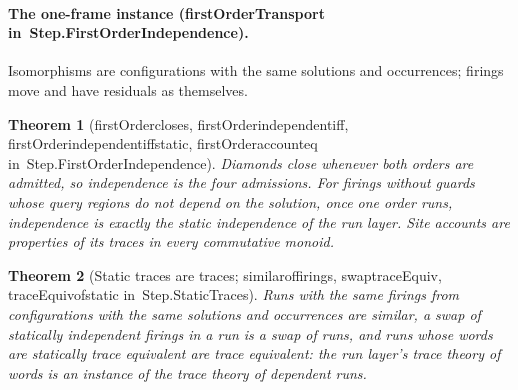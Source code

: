 \documentclass[11pt]{article}
\newtheorem{theorem}{Theorem}
\theoremstyle{remark}
\newcommand{\lean}[1]{{\ttfamily\def\_{\textunderscore\allowbreak}#1}}
\newcommand{\inmod}[1]{in~{\ttfamily\def\_{\textunderscore\allowbreak}#1}}
\begin{document}
\paragraph{The one-frame instance (\lean{firstOrderTransport} \inmod{Step.FirstOrderIndependence}).}
Isomorphisms are configurations with the same solutions and occurrences; firings move and have
residuals as themselves.
\begin{theorem}[\lean{firstOrder\_closes}, \lean{firstOrder\_independent\_iff}, \lean{firstOrder\_independent\_iff\_static}, \lean{firstOrder\_account\_eq} \inmod{Step.FirstOrderIndependence}]
Diamonds close whenever both orders are admitted, so independence is the four admissions. For firings
without guards whose query regions do not depend on the solution, once one order runs, independence is
exactly the static independence of the run layer. Site accounts are properties of its traces in every
commutative monoid.
\end{theorem}
\begin{theorem}[Static traces are traces; \lean{similar\_of\_firings}, \lean{swap\_traceEquiv}, \lean{traceEquiv\_of\_static} \inmod{Step.StaticTraces}]
Runs with the same firings from configurations with the same solutions and occurrences are similar, a
swap of statically independent firings in a run is a swap of runs, and runs whose words are statically
trace equivalent are trace equivalent: the run layer's trace theory of words is an instance of the trace
theory of dependent runs.
\end{theorem}
\end{document}
